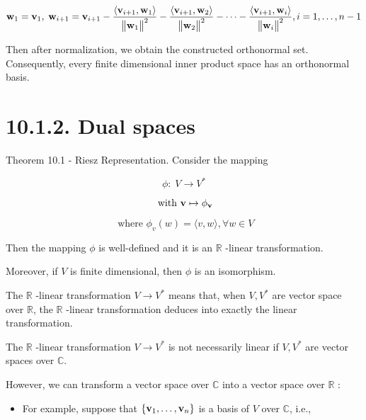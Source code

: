 \documentclass[11pt]{article}
\begin{document}
\[
{\bf w}_1 = {\bf v}_1,\;{\bf w}_{i + 1} = {\bf v}_{i + 1} - \frac{\left\langle  {\bf v}_{i + 1},{\bf w}_1\right\rangle  }{{\begin{Vmatrix}{\bf w}_1\end{Vmatrix}}^2} - \frac{\left\langle  {\bf v}_{i + 1},{\bf w}_2\right\rangle  }{{\begin{Vmatrix}{\bf w}_2\end{Vmatrix}}^2} - \cdots  - \frac{\left\langle  {\bf v}_{i + 1},{\bf w}_{i}\right\rangle  }{{\begin{Vmatrix}{\bf w}_{i}\end{Vmatrix}}^2},i = 1,\ldots ,n - 1
\]

Then after normalization, we obtain the constructed orthonormal set. Consequently, every finite dimensional inner product space has an orthonormal basis.

\section*{10.1.2. Dual spaces}

Theorem 10.1 - Riesz Representation. Consider the mapping

\[
\phi  : \;V \rightarrow  {V}^{ * }
\]

\[
\text{ with }\mathbf{v} \mapsto  {\phi }_{\bf v}
\]

\[
\text{ where }{\phi }_{v}\left( w\right)  = \langle v,w\rangle ,\forall w \in  V
\]

Then the mapping \(\phi\) is well-defined and it is an \(\mathbb{R}\) -linear transformation.

Moreover, if \(V\) is finite dimensional, then \(\phi\) is an isomorphism.

The \(\mathbb{R}\) -linear transformation \(V \rightarrow  {V}^{ * }\) means that, when \(V,{V}^{ * }\) are vector space over \(\mathbb{R}\), the \(\mathbb{R}\) -linear transformation deduces into exactly the linear transformation.

The \(\mathbb{R}\) -linear transformation \(V \rightarrow  {V}^{ * }\) is not necessarily linear if \(V,{V}^{ * }\) are vector spaces over \(\mathbb{C}\).

However, we can transform a vector space over \(\mathbb{C}\) into a vector space over \(\mathbb{R}\) :

\begin{itemize}
\item For example, suppose that \(\left\{  {{\bf v}_1,\ldots ,{\bf v}_n}\right\}\) is a basis of \(V\) over \(\mathbb{C}\), i.e.,
\end{itemize}
\end{document}
